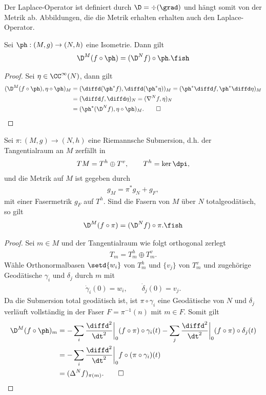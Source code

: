 \documentclass[%
	paper=a5,%
	fleqn,%
	DIV=18,%
	BCOR=0mm,
	fontsize=11pt,
	titlepage=false,%
	bibliography=totoc,
	DIV=18,%
	twoside=true,
	pdftitle=Riemannsche Geometrie,
	pdfauthor=Uwe Semmelmann,
	numbers=noendperiod]%
	{scrbook}
\begin{document}
Der Laplace-Operator ist definiert durch $\D =\div(\grad)$  und hängt somit von der Metrik ab. Abbildungen, die die Metrik erhalten erhalten auch den Laplace-Operator.

\begin{prop}
Sei $\ph: (M,g)\to (N,h)$ eine Isometrie. Dann gilt
\begin{align*}
\D^M(f\circ\ph) = (\D^Nf)\circ\ph.\fish
\end{align*}
\end{prop}
\begin{proof}
Sei $\eta\in\CC^\infty(N)$, dann gilt
\begin{align*}
(\D^M(f\circ\ph),\eta\circ\ph)_{M} &= 
(\diffd(\ph^* f),\diffd(\ph^*\eta))_{M}
=
(\ph^*\diffd f,\ph^*\diffd\eta)_{M}\\
&=
(\diffd f,\diffd\eta)_{N}
=
(\nabla^N f,\eta)_{N}\\
&= 
(\ph^*(\D^N f),\eta\circ\ph)_{M}.\qed
\end{align*} 
\end{proof}

\begin{prop}
Sei $\pi: (M,g)\to (N,h)$ eine Riemannsche Submersion, d.h. der Tangentialraum an $M$ zerfällt in
\begin{align*}
TM = T^h\oplus T^v,\qquad T^h= \ker\dpi,
\end{align*}
und die Metrik auf $M$ ist gegeben durch
\begin{align*}
g_{M} = \pi^*g_{N} + g_{F},
\end{align*}
mit einer Fasermetrik $g_{F}$ auf $T^h$. Sind die Fasern von $M$ über $N$ totalgeodätisch, so gilt
\begin{align*}
\D^M(f\circ\pi) = (\D^N f)\circ\pi.\fish
\end{align*}
\end{prop}
\begin{proof}
Sei $m\in M$ und der Tangentialraum wie folgt orthogonal zerlegt
\begin{align*}
T_{m} = T_{m}^h \oplus T_{m}^v.
\end{align*}
Wähle Orthonormalbasen $\setd{w_{i}}$ von $T_{m}^h$ und $\{v_{j}\}$ von $T_{m}^v$ und zugehörige Geodätische $\gamma_{i}$ und $\delta_{j}$ durch $m$ mit
\begin{align*}
\dot\gamma_{i}(0) = w_{i},\qquad \dot\delta_{j}(0) = v_{j}.
\end{align*}
Da die Submersion total geodätisch ist, ist $\pi\circ\gamma_{i}$ eine Geodätische von $N$ und $\delta_{j}$ verläuft vollständig in der Faser $F=\pi^{-1}(n)$ mit $m\in F$. Somit gilt
\begin{align*}
\D^M(f\circ\ph)_{m} &= -\sum_{i}\frac{\diffd^2}{\dt^2}\bigg|_{0} (f\circ\pi)\circ \gamma_{i}(t)
 -\sum_{j}\frac{\diffd^2}{\dt^2}\bigg|_{0} (f\circ\pi)\circ \delta_{j}(t)\\
&  = -\sum_{i}\frac{\diffd^2}{\dt^2}\bigg|_{0} f\circ(\pi\circ \gamma_{i})(t)\\
&  = (\Delta^N f)_{\pi(m)}.\qed
\end{align*}
\end{proof}
\end{document}
